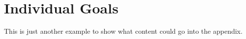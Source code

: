 \chapter{Individual Goals} \label{cha:individual-goals}
This is just another example to show what content could go into the appendix.